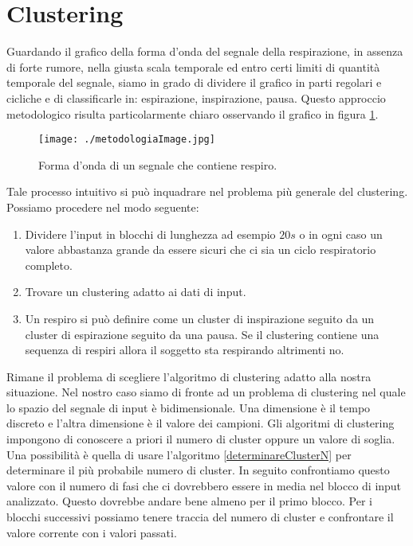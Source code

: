 \section{Clustering}
\label{clusteringMetodologia}

Guardando il grafico della forma d'onda del segnale della respirazione, in assenza di forte rumore, nella giusta scala temporale ed entro certi limiti di quantit\`a temporale del segnale, siamo in grado di dividere il grafico in parti regolari e cicliche e di classificarle in: espirazione, inspirazione, pausa. 
Questo approccio metodologico risulta particolarmente chiaro osservando il grafico in figura \ref{grafico}.

\begin{figure}
\centering
 \texttt{[image: ./metodologiaImage.jpg]}
  \label{grafico}
  \caption{Forma d'onda di un segnale che contiene respiro.}
\end{figure}

Tale processo intuitivo si pu\`o inquadrare nel problema pi\`u generale del clustering. Possiamo procedere nel modo seguente:
\begin{enumerate}
  \item 
    Dividere l'input in blocchi di lunghezza ad esempio $20s$ o in ogni caso un valore abbastanza grande da essere sicuri che ci sia un ciclo respiratorio completo. 
  \item
    Trovare un clustering adatto ai dati di input.
  \item
    Un respiro si pu\`o definire come un cluster di inspirazione seguito da un cluster di espirazione seguito da una pausa. Se il clustering contiene una sequenza di respiri allora il soggetto sta respirando altrimenti no.
\end{enumerate}

Rimane il problema di scegliere l'algoritmo di clustering adatto alla nostra situazione. 
Nel nostro caso siamo di fronte ad un problema di clustering nel quale lo spazio del segnale di input \`e bidimensionale. 
Una dimensione \`e il tempo discreto e l'altra dimensione \`e il valore dei campioni. 
Gli algoritmi di clustering impongono di conoscere a priori il numero di cluster oppure un valore di soglia. 
Una possibilit\`a \`e quella di usare l'algoritmo \ref{determinareClusterN} per determinare il pi\`u probabile numero di cluster. 
In seguito confrontiamo questo valore con il numero di fasi che ci dovrebbero essere in media nel blocco di input analizzato. 
Questo dovrebbe andare bene almeno per il primo blocco. 
Per i blocchi successivi possiamo tenere traccia del numero di cluster e confrontare il valore corrente con i valori passati.
